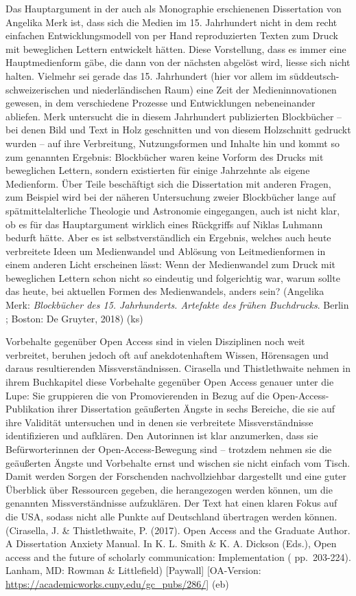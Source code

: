 \documentclass[a4paper,
fontsize=11pt,
oneside,
numbers=noperiodatend,
parskip=half-,
bibliography=totoc,
final
]{scrartcl}
\begin{document}
Das Hauptargument in der auch als Monographie erschienenen Dissertation
von Angelika Merk ist, dass sich die Medien im 15. Jahrhundert nicht in
dem recht einfachen Entwicklungsmodell von per Hand reproduzierten
Texten zum Druck mit beweglichen Lettern entwickelt hätten. Diese
Vorstellung, dass es immer eine Hauptmedienform gäbe, die dann von der
nächsten abgelöst wird, liesse sich nicht halten. Vielmehr sei gerade
das 15. Jahrhundert (hier vor allem im süddeutsch-schweizerischen und
niederländischen Raum) eine Zeit der Medieninnovationen gewesen, in dem
verschiedene Prozesse und Entwicklungen nebeneinander abliefen. Merk
untersucht die in diesem Jahrhundert publizierten Blockbücher -- bei
denen Bild und Text in Holz geschnitten und von diesem Holzschnitt
gedruckt wurden -- auf ihre Verbreitung, Nutzungsformen und Inhalte hin
und kommt so zum genannten Ergebnis: Blockbücher waren keine Vorform des
Drucks mit beweglichen Lettern, sondern existierten für einige
Jahrzehnte als eigene Medienform. Über Teile beschäftigt sich die
Dissertation mit anderen Fragen, zum Beispiel wird bei der näheren
Untersuchung zweier Blockbücher lange auf spätmittelalterliche Theologie
und Astronomie eingegangen, auch ist nicht klar, ob es für das
Hauptargument wirklich eines Rückgriffs auf Niklas Luhmann bedurft
hätte. Aber es ist selbstverständlich ein Ergebnis, welches auch heute
verbreitete Ideen um Medienwandel und Ablösung von Leitmedienformen in
einem anderen Licht erscheinen lässt: Wenn der Medienwandel zum Druck
mit beweglichen Lettern schon nicht so eindeutig und folgerichtig war,
warum sollte das heute, bei aktuellen Formen des Medienwandels, anders
sein? (Angelika Merk: \emph{Blockbücher des 15. Jahrhunderts. Artefakte
des frühen Buchdrucks}. Berlin ; Boston: De Gruyter, 2018) (ks)

Vorbehalte gegenüber Open Access sind in vielen Disziplinen noch weit
verbreitet, beruhen jedoch oft auf anekdotenhaftem Wissen, Hörensagen
und daraus resultierenden Missverständnissen. Cirasella und
Thistlethwaite nehmen in ihrem Buchkapitel diese Vorbehalte gegenüber
Open Access genauer unter die Lupe: Sie gruppieren die von
Promovierenden in Bezug auf die Open-Access-Publikation ihrer
Dissertation geäußerten Ängste in sechs Bereiche, die sie auf ihre
Validität untersuchen und in denen sie verbreitete Missverständnisse
identifizieren und aufklären. Den Autorinnen ist klar anzumerken, dass
sie Befürworterinnen der Open-Access-Bewegung sind -- trotzdem nehmen
sie die geäußerten Ängste und Vorbehalte ernst und wischen sie nicht
einfach vom Tisch. Damit werden Sorgen der Forschenden nachvollziehbar
dargestellt und eine guter Überblick über Ressourcen gegeben, die
herangezogen werden können, um die genannten Missverständnisse
aufzuklären. Der Text hat einen klaren Fokus auf die USA, sodass nicht
alle Punkte auf Deutschland übertragen werden können. (Cirasella, J. \&
Thistlethwaite, P. (2017). Open Access and the Graduate Author. A
Dissertation Anxiety Manual. In K. L. Smith \& K. A. Dickson (Eds.),
Open access and the future of scholarly communication: Implementation (
pp.~203-224). Lanham, MD: Rowman \& Littlefield) {[}Paywall{]}
{[}OA-Version: \url{https://academicworks.cuny.edu/gc_pubs/286/}{]} (eb)
\end{document}

